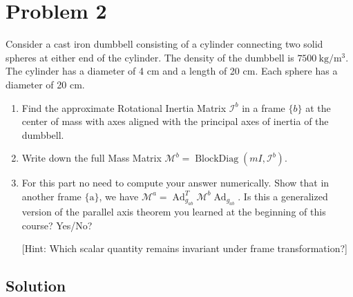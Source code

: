 \section*{Problem 2}
\setcounter{section}{2}
\setcounter{equation}{0}

Consider a cast iron dumbbell consisting of a cylinder connecting two solid spheres at either end of the cylinder.
The density of the dumbbell is \( 7500 \mathrm{~kg} / \mathrm{m}^{3} \).
The cylinder has a diameter of 4 cm and a length of 20 cm.
Each sphere has a diameter of 20 cm.
\begin{enumerate}[label= (\alph*)]
    \item Find the approximate Rotational Inertia Matrix \( \mathcal{I}^{b} \) in a frame \( \{b\} \) at the center of mass with axes aligned with the principal axes of inertia of the dumbbell.

    \item Write down the full Mass Matrix \( \mathcal{M}^{b}=\operatorname{BlockDiag}\left(m I, \mathcal{I}^{b}\right) \).

    \item For this part no need to compute your answer numerically.
          Show that in another frame \( \{\mathrm{a}\} \), we have \( \mathcal{M}^{a}=\operatorname{Ad}_{g_{a b}}^{T} \mathcal{M}^{b} \operatorname{Ad}_{g_{a b}} \).
          Is this a generalized version of the parallel axis theorem you learned at the beginning of this course? Yes/No?

          [Hint: Which scalar quantity remains invariant under frame transformation?]
\end{enumerate}

\subsection*{Solution}

